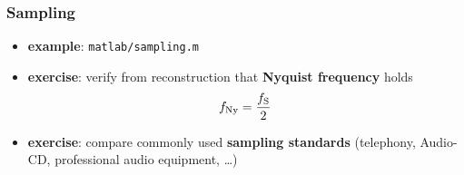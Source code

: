 \begin{frame} %
	\frametitle{Sampling}
	\begin{itemize}
		\item \textbf{example}: \texttt{matlab/sampling.m}
			\begin{figure}
				\centering
				\begin{subfigure}[c]{0.48\linewidth}
				\end{subfigure}
				\hspace{0.01\linewidth}
				\begin{subfigure}[c]{0.48\linewidth}
				\end{subfigure}
			\end{figure}
		\item \textbf{exercise}: verify from reconstruction that \textbf{Nyquist frequency} holds
			\begin{align*}
				f_{\textrm{Ny}}=\frac{f_{\textrm S}}2
			\end{align*}
		\item \textbf{exercise}: compare commonly used \textbf{sampling standards} (telephony, Audio-CD, professional audio equipment, \ldots)
	\end{itemize}
\end{frame}

